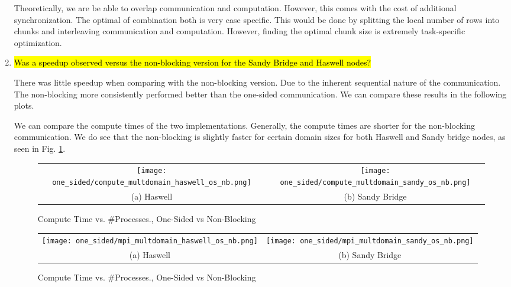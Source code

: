 \begin{enumerate}
	Theoretically, we are be able to overlap communication and computation. However, this comes with the cost of additional synchronization. The optimal of combination both is very case specific. This would be done by splitting the local number of rows into chunks and interleaving communication and computation. However, finding the optimal chunk size is extremely task-specific optimization.

  \item \hl{Was a speedup observed versus the non-blocking version for the Sandy Bridge and Haswell nodes?}

	There was little speedup when comparing with the non-blocking version. Due to the inherent sequential nature of the communication. The non-blocking more consistently performed better than the one-sided communication. We can compare these results in the following plots.
	
	We can compare the compute times of the two implementations. Generally, the compute times are shorter for the non-blocking communication. 
	We do see that the non-blocking is slightly faster for certain domain sizes for both Haswell and Sandy bridge nodes, as seen in Fig. \ref{fig:compute_multdomain_os_nb}.
	    	\begin{figure}[h] %
		\hspace*{-0.25\linewidth}\begin{tabular}{cc}
			\texttt{[image: one\_sided/compute\_multdomain\_haswell\_os\_nb.png]} & \texttt{[image: one\_sided/compute\_multdomain\_sandy\_os\_nb.png]} \\
			(a) Haswell &  (b) Sandy Bridge\\[6pt]
		\end{tabular}
		\caption{Compute Time vs. \#Processes., One-Sided vs Non-Blocking}
		\label{fig:compute_multdomain_os_nb}
	\end{figure}
	
	
	\begin{figure}[h] %
		\hspace*{-0.25\linewidth}\begin{tabular}{cc}
			\texttt{[image: one\_sided/mpi\_multdomain\_haswell\_os\_nb.png]} & \texttt{[image: one\_sided/mpi\_multdomain\_sandy\_os\_nb.png]} \\
			(a) Haswell &  (b) Sandy Bridge\\[6pt]
		\end{tabular}
		\caption{Compute Time vs. \#Processes., One-Sided vs Non-Blocking}
		\label{fig:mpi_multdomain_os_nb}
	\end{figure}
	

\end{enumerate}
